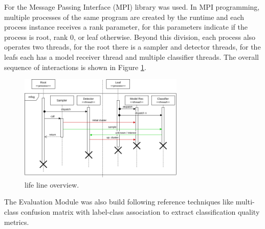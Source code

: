 For \mfog the Message Passing Interface (MPI) library was used.
In MPI programming, multiple processes of the same program are created by the
runtime and each process instance receives a rank parameter, for \mfog this
parameters indicate if the process is root, rank $0$, or leaf otherwise.
Beyond this division, each process also operates two threads, for the root
there is a sampler and detector threads, for the leafs each has a model receiver
thread and multiple classifier threads.
The overall sequence of interactions is shown in Figure \ref{fig:mfog-mpi-life}.

\begin{figure}[htb]
  \centerline{\includegraphics[width=0.7\textwidth]{figures/mfog-arch-mpi.png}}
  \caption{\mfog life line overview.}
  \label{fig:mfog-mpi-life}
\end{figure}

The Evaluation Module was also build following reference techniques like
multi-class confusion matrix with label-class association
\cite{Faria2016minas}
to extract classification quality metrics.
